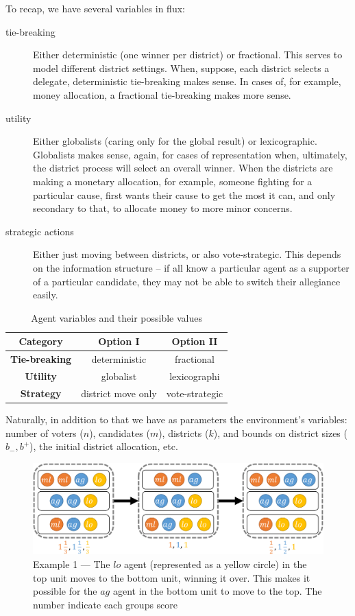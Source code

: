 \documentclass[letterpaper]{article} %
\begin{document}
To recap, we have several variables in flux:
\begin{description}
	\item[tie-breaking] Either deterministic (one winner per district) or fractional. This serves to model different district settings. When, suppose, each district selects a delegate, deterministic tie-breaking makes sense. In cases of, for example, money allocation, a fractional tie-breaking makes more sense.
	\item[utility] Either globalists (caring only for the global result) or lexicographic. Globalists makes sense, again, for cases of representation when, ultimately, the district process will select an overall winner. When the districts are making a monetary allocation, for example, someone fighting for a particular cause, first wants their cause to get the most it can, and only secondary to that, to allocate money to more minor concerns.
	\item[strategic actions] Either just moving between districts, or also vote-strategic. This depends on the information structure -- if all know a particular agent as a supporter of a particular candidate, they may not be able to switch their allegiance easily.
\end{description}
\begin{table}[htp]
\caption{Agent variables and their possible values}
\begin{center}
\begin{tabular}{|c|c|c|}
\hline
\textbf{Category} & \textbf{Option I}& \textbf{Option II}\\
\hline
\textbf{Tie-breaking} & deterministic & fractional\\
\textbf{Utility} & globalist & lexicographi\\
\textbf{Strategy} & district move only & vote-strategic\\
\hline
\end{tabular}
\end{center}
\end{table}


Naturally, in addition to that we have as parameters the environment's variables: number of voters ($n$), candidates ($m$), districts ($k$), and bounds on district sizes ($b_{-},b^{+}$), the initial district allocation, etc.
\begin{figure}
	\centering
	\includegraphics[width=\columnwidth]{example.pdf}
	\caption{Example 1 --- The $lo$ agent (represented as a yellow circle) in the top unit moves to the bottom unit, winning it over. This makes it possible for the $ag$ agent in the bottom unit to move to the top. The number indicate each groups score}
	\label{fig:example}
\end{figure}
\end{document}
